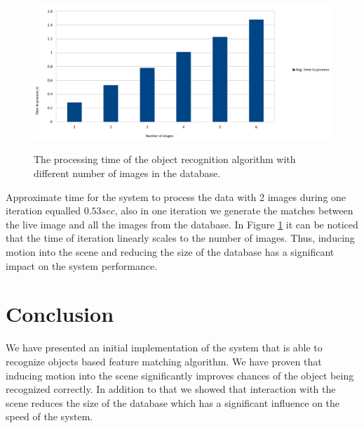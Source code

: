\begin{figure}

\includegraphics[width=1.5\columnwidth]{figures/thesis-time.png}\\


\caption{The processing time of the object recognition algorithm with different number of images in the database.}
\label{fig:recognition-time}
\end{figure}

Approximate time for the system to process the data with 2 images during one iteration equalled $0.53 sec$, also in one iteration we generate the matches between the live image and all the images from the database. In Figure \ref{fig:recognition-time} it can be noticed that the time of iteration linearly scales to the number of images. Thus, inducing motion into the scene and reducing the size of the database has a significant impact on the system performance.





\section{Conclusion}
We have presented an initial implementation of the system that is able to recognize objects based feature matching algorithm. We have proven that inducing motion into the scene significantly improves chances of the object being recognized correctly. In addition to that we showed that interaction with the scene reduces the size of the database which has a significant influence on the speed of the system.  
